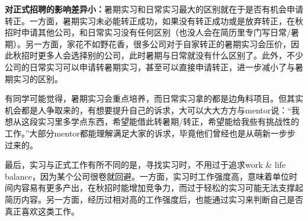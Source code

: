 \textbf{对正式招聘的影响差异小：}暑期实习和日常实习最大的区别就在于是否有机会申请转正。一方面，暑期实习未必能转正成功，如果没有转正成功或是放弃转正，在秋招时申请其他公司，和日常实习没有任何区别（也没人会在简历里专门写日常/暑期）。另一方面，家花不如野花香，很多公司对于自家转正的暑期实习会压价，因此秋招时更多人会选择别的公司，此时暑期与日常就没有什么区别了。此外，不少公司的日常实习可以申请转暑期实习，甚至可以直接申请转正，进一步减小了与暑期实习的区别。

有同学可能觉得，暑期实习会重点培养，而日常实习拿的都是边角料项目。但其实机会都是人争取来的，有想要提升自己的诉求，大可以大大方方与mentor说：“我想从这段实习里多学点东西，希望能借此转暑期/转正，希望能给我些有挑战性的工作。”大部分mentor都能理解满足大家的诉求，毕竟他们曾经也是从萌新一步步过来的。

最后，实习与正式工作有所不同的是，寻找实习时，不用过于追求work \& life balance，因为某个公司很卷就回避。一方面，实习时工作强度高，意味着单位时间内容易有更多产出，在秋招时能增加竞争力，而过于轻松的实习可能无法支撑起简历内容。另一方面，经历过相对高的工作强度后，也能通过实习来判断自己是否真正喜欢这类工作。